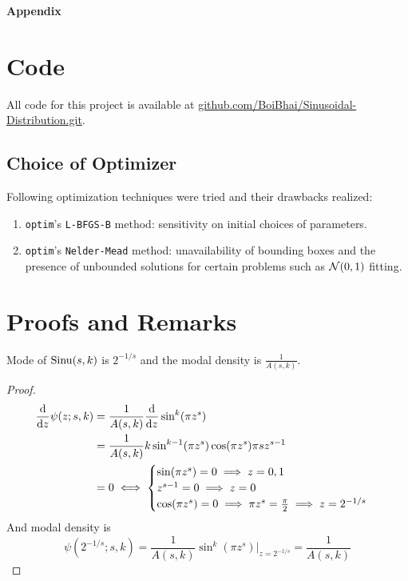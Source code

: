 \newpage\appendix
{\LARGE \textbf{Appendix}}
\section{Code}
All code for this project is available at \hyperlink{github.com/BoiBhai/Sinusoidal-Distribution.git}{github.com/BoiBhai/Sinusoidal-Distribution.git}.

\subsection{Choice of Optimizer}
Following optimization techniques were tried and their drawbacks realized:
\begin{enumerate}
    \item \texttt{optim}'s \texttt{L-BFGS-B} method: sensitivity on initial choices of parameters.
    \item \texttt{optim}'s \texttt{Nelder-Mead} method: unavailability of bounding boxes and the presence of unbounded solutions for certain problems such as $\mathcal{N} (0,1)$ fitting.
\end{enumerate}

\section{Proofs and Remarks}
\begin{thm}\label{thm:mode}
        Mode of $\operatorname*{Sinu} (s,k)$ is $2^{-1/s}$ and the modal density is $\frac{1}{A(s,k)}$.
        \end{thm}
\begin{proof}
	\begin{align*}
		\frac{\mathrm d}{\mathrm d z} \psi(z; s,k) &= \frac{1}{A(s,k)} \frac{\mathrm d}{\mathrm d z} \sin^k(\pi z^s)\\
		&= \frac{1}{A(s,k)} k \sin^{k-1}(\pi z^s) \cos(\pi z^s) \pi s z^{s-1}\\
		&= 0 \iff \begin{cases}
			\sin(\pi z^s) =0 \implies z=0,1\\
			z^{s-1} = 0 \implies z=0\\
			\cos(\pi z^s) = 0 \implies \pi z^s = \frac{\pi}{2} \implies z = 2^{-1/s}
		\end{cases}
	\end{align*}
	And modal density is \[\psi(2^{-1/s}; s,k) = \frac{1}{A(s,k)} \sin^k(\pi z^s)\bigg|_{z=2^{-1/s}} = \frac{1}{A(s,k)}\]
\end{proof}


